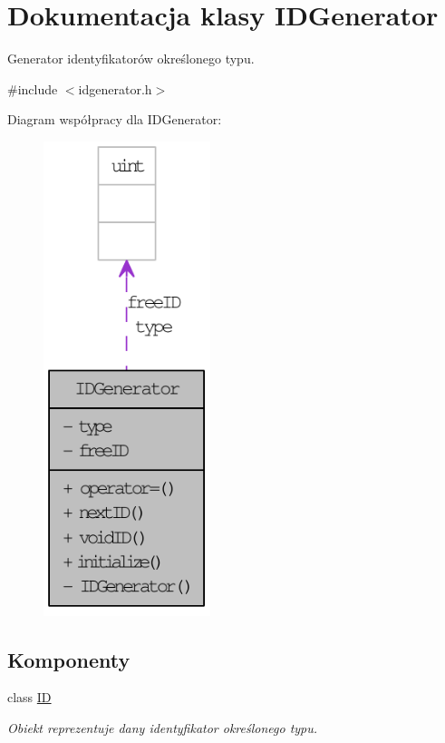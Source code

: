 \hypertarget{classIDGenerator}{
\section{Dokumentacja klasy IDGenerator}
\label{classIDGenerator}
}


Generator identyfikatorów określonego typu.  




{\ttfamily \#include $<$idgenerator.h$>$}



Diagram współpracy dla IDGenerator:\nopagebreak
\begin{figure}[H]
\begin{center}
\leavevmode
\includegraphics[width=138pt]{classIDGenerator__coll__graph}
\end{center}
\end{figure}
\subsection*{Komponenty}
\begin{DoxyCompactItemize}
\item 
class \hyperlink{classIDGenerator_1_1ID}{ID}
\begin{DoxyCompactList}\small\item\em Obiekt reprezentuje dany identyfikator określonego typu. \item\end{DoxyCompactList}\end{DoxyCompactItemize}
